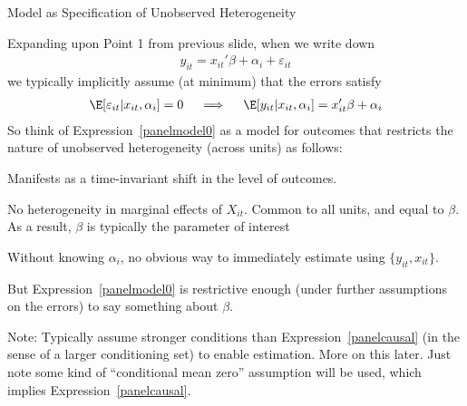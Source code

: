 \documentclass[aspectratio=169, handout]{beamer}
\begin{document}
{\scriptsize
\begin{frame}{%
    Model as Specification of Unobserved Heterogeneity
}

Expanding upon Point 1 from previous slide,
when we write down
\begin{align}
  y_{it}
  =
  x_{it}'\beta
  + \alpha_i
  + \varepsilon_{it}
  \label{panelmodel0}
\end{align}
we typically implicitly assume (at minimum)
that the errors satisfy
\begin{align}
  \E[\varepsilon_{it}|x_{it},\alpha_i]=0
  \quad\implies\quad
  \E[y_{it}|x_{it},\alpha_i] = x_{it}'\beta + \alpha_i
  \label{panelcausal}
\end{align}
So think of Expression~\ref{panelmodel0} as a \alert{model} for outcomes
that \alert{restricts} the nature of unobserved \alert{heterogeneity}
(across units) as follows:
\begin{itemize}
  \pause
  {\scriptsize
  \item Manifests as a \alert{time-invariant} shift in the \alert{level}
    of outcomes.
  \pause
  \item \alert{No heterogeneity} in \alert{marginal effects} of
    $X_{it}$.
    Common to all units, and equal to $\beta$.
    As a result, $\beta$ is typically the parameter of interest


  \pause
  \item Without knowing $\alpha_i$, no obvious way to immediately
    estimate using $\{y_{it},x_{it}\}$.

  \item But Expression~\ref{panelmodel0} is restrictive enough (under
    further assumptions on the errors) to say something about $\beta$.
  }
\end{itemize}
\pause
Note:
Typically assume \alert{stronger} conditions than
Expression~\ref{panelcausal} (in the sense of a larger conditioning
set) to enable estimation.
More on this later.
Just note some kind of ``conditional mean zero''
assumption will be used, which implies
Expression~\ref{panelcausal}.
\end{frame}
}
\end{document}
